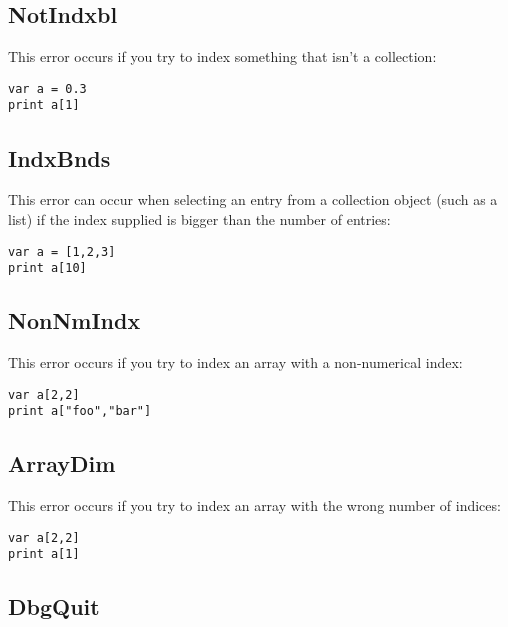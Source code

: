 \hypertarget{notindxbl}{%
\subsection{NotIndxbl}\label{notindxbl}}

This error occurs if you try to index something that isn't a collection:

\begin{lstlisting}
var a = 0.3
print a[1]
\end{lstlisting}

\hypertarget{indxbnds}{%
\subsection{IndxBnds}\label{indxbnds}}

This error can occur when selecting an entry from a collection object
(such as a list) if the index supplied is bigger than the number of
entries:

\begin{lstlisting}
var a = [1,2,3]
print a[10]
\end{lstlisting}

\hypertarget{nonnmindx}{%
\subsection{NonNmIndx}\label{nonnmindx}}

This error occurs if you try to index an array with a non-numerical
index:

\begin{lstlisting}
var a[2,2]
print a["foo","bar"]
\end{lstlisting}

\hypertarget{arraydim}{%
\subsection{ArrayDim}\label{arraydim}}

This error occurs if you try to index an array with the wrong number of
indices:

\begin{lstlisting}
var a[2,2]
print a[1]
\end{lstlisting}

\hypertarget{dbgquit}{%
\subsection{DbgQuit}\label{dbgquit}}

